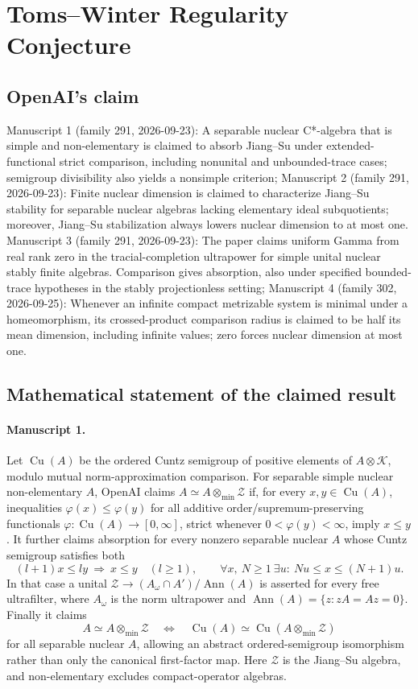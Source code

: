 \documentclass[11pt]{article}
\begin{document}
\section*{Toms–Winter Regularity Conjecture}

\subsection{OpenAI's claim}
Manuscript 1 (family 291, 2026-09-23): A separable nuclear C*-algebra that is simple and non-elementary is claimed to absorb Jiang--Su under extended-functional strict comparison, including nonunital and unbounded-trace cases; semigroup divisibility also yields a nonsimple criterion; Manuscript 2 (family 291, 2026-09-23): Finite nuclear dimension is claimed to characterize Jiang--Su stability for separable nuclear algebras lacking elementary ideal subquotients; moreover, Jiang--Su stabilization always lowers nuclear dimension to at most one. Manuscript 3 (family 291, 2026-09-23): The paper claims uniform Gamma from real rank zero in the tracial-completion ultrapower for simple unital nuclear stably finite algebras. Comparison gives absorption, also under specified bounded-trace hypotheses in the stably projectionless setting; Manuscript 4 (family 302, 2026-09-25): Whenever an infinite compact metrizable system is minimal under a homeomorphism, its crossed-product comparison radius is claimed to be half its mean dimension, including infinite values; zero forces nuclear dimension at most one.

\subsection{Mathematical statement of the claimed result}
\paragraph{Manuscript 1.}
Let $\operatorname{Cu}(A)$ be the ordered Cuntz semigroup of positive elements of $A\otimes\mathcal K$, modulo mutual norm-approximation comparison. For separable simple nuclear non-elementary $A$, OpenAI claims $A\simeq A\otimes_{\min}\mathcal Z$ if, for every $x,y\in\operatorname{Cu}(A)$, inequalities $\varphi(x)\le\varphi(y)$ for all additive order/supremum-preserving functionals $\varphi:\operatorname{Cu}(A)\to[0,\infty]$, strict whenever $0<\varphi(y)<\infty$, imply $x\le y$.
It further claims absorption for every nonzero separable nuclear $A$ whose Cuntz semigroup satisfies both
\[
(l+1)x\le ly\ \Longrightarrow\ x\le y\quad(l\ge1),\qquad
\forall x,\ N\ge1\ \exists u:\ Nu\le x\le(N+1)u.
\]
In that case a unital $\mathcal Z\to (A_\omega\cap A')/\operatorname{Ann}(A)$ is asserted for every free ultrafilter, where $A_\omega$ is the norm ultrapower and $\operatorname{Ann}(A)=\{z:zA=Az=0\}$. Finally it claims
\[
A\simeq A\otimes_{\min}\mathcal Z\quad\Longleftrightarrow\quad
\operatorname{Cu}(A)\simeq\operatorname{Cu}(A\otimes_{\min}\mathcal Z)
\]
for all separable nuclear $A$, allowing an abstract ordered-semigroup isomorphism rather than only the canonical first-factor map. Here $\mathcal Z$ is the Jiang--Su algebra, and non-elementary excludes compact-operator algebras.
\end{document}
